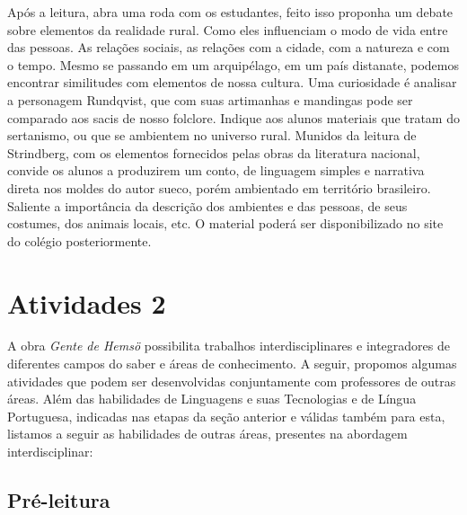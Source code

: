 \documentclass[12pt]{extarticle}
\begin{document}
Após a leitura, abra uma roda com os estudantes, feito isso
proponha um debate sobre elementos da realidade rural. Como eles
influenciam o modo de vida entre das pessoas. As relações sociais, as
relações com a cidade, com a natureza e com o tempo. Mesmo se passando
em um arquipélago, em um país distanate, podemos encontrar similitudes
com elementos de nossa cultura. Uma curiosidade é analisar a personagem
Rundqvist, que com suas artimanhas e mandingas pode ser comparado aos
sacis de nosso folclore. Indique aos alunos materiais que tratam do
sertanismo, ou que se ambientem no universo rural. Munidos da leitura de
Strindberg, com os elementos fornecidos pelas obras da literatura
nacional, convide os alunos a produzirem um conto, de linguagem simples
e narrativa direta nos moldes do autor sueco, porém ambientado em
território brasileiro. Saliente a importância da descrição dos ambientes
e das pessoas, de seus costumes, dos animais locais, etc. O material
poderá ser disponibilizado no site do colégio posteriormente.

\section{Atividades 2}


A obra \emph{Gente de Hemsö} possibilita trabalhos interdisciplinares e
integradores de diferentes campos do saber e áreas de conhecimento. A
seguir, propomos algumas atividades que podem ser desenvolvidas
conjuntamente com professores de outras áreas. Além das habilidades de
Linguagens e suas Tecnologias e de Língua Portuguesa, indicadas nas
etapas da seção anterior e válidas também para esta, listamos a seguir
as habilidades de outras áreas, presentes na abordagem interdisciplinar:

\subsection{Pré-leitura}
\end{document}

